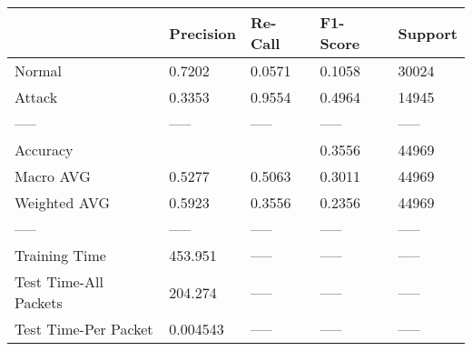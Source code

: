 \begin{tabular}{lllll}
\toprule
{} & Precision & Re-Call & F1-Score & Support \\
\midrule
Normal                &    0.7202 &  0.0571 &   0.1058 &   30024 \\
Attack                &    0.3353 &  0.9554 &   0.4964 &   14945 \\
-----                 &     ----- &   ----- &    ----- &   ----- \\
Accuracy              &           &         &   0.3556 &   44969 \\
Macro AVG             &    0.5277 &  0.5063 &   0.3011 &   44969 \\
Weighted AVG          &    0.5923 &  0.3556 &   0.2356 &   44969 \\
-----                 &     ----- &   ----- &    ----- &   ----- \\
Training Time         &   453.951 &   ----- &    ----- &   ----- \\
Test Time-All Packets &   204.274 &   ----- &    ----- &   ----- \\
Test Time-Per Packet  &  0.004543 &   ----- &    ----- &   ----- \\
\bottomrule
\end{tabular}
